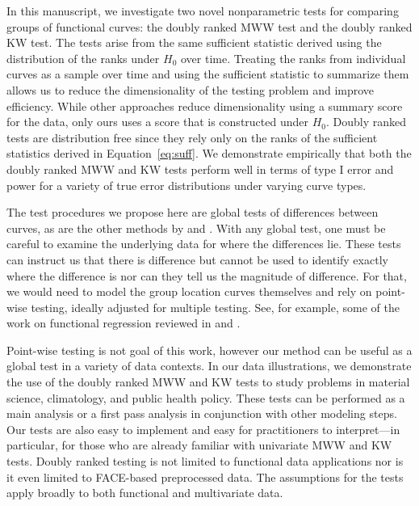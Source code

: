 \documentclass[12pt]{article}
\theoremstyle{plain}
\begin{document}
	In this manuscript, we investigate two novel nonparametric tests for comparing groups of functional curves: the doubly ranked MWW test and the doubly ranked KW test. The tests arise from the same sufficient statistic derived using the distribution of the ranks under $H_0$ over time. Treating the ranks from individual curves as a sample over time and using the sufficient statistic to summarize them allows us to reduce the dimensionality of the testing problem and improve efficiency. While other approaches reduce dimensionality using a summary score for the data, only ours uses a score that is constructed under $H_0$. Doubly ranked tests are distribution free since they rely only on the ranks of the sufficient statistics derived in Equation~\ref{eq:suff}. We demonstrate empirically that both the doubly ranked MWW and KW tests perform well in terms of type I error and power for a variety of true error distributions under varying curve types.
	
	The test procedures we propose here are global tests of differences between curves, as are the other methods by \cite{Hall2007,Lopez2009,Lopez2010,Chak2015} and \cite{Melendez2021}. With any global test, one must be careful to examine the underlying data for where the differences lie. These tests can instruct us that there is difference but cannot be used to identify exactly where the difference is nor can they tell us the magnitude of difference. For that, we would need to model the group location curves themselves and rely on point-wise testing, ideally adjusted for multiple testing. See, for example, some of the work on functional regression reviewed in \cite{Morris2015} and \cite{Greven2017}.
	
	Point-wise testing is not goal of this work, however our method can be useful as a global test in a variety of data contexts. In our data illustrations, we demonstrate the use of the doubly ranked MWW and KW tests to study problems in material science, climatology, and public health policy. 
	These tests can be performed as a main analysis or a first pass analysis in conjunction with other modeling steps. Our tests are also easy to implement and easy for practitioners to interpret---in particular, for those who are already familiar with univariate MWW and KW tests. Doubly ranked testing is not limited to functional data applications nor is it even limited to FACE-based preprocessed data. The assumptions for the tests apply broadly to both functional and multivariate data.
	
\end{document}
